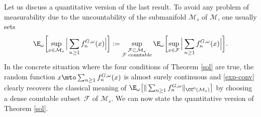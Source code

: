Let us discuss a quantitative version of the last result.
To avoid any problem of measurability due to the uncountability of the submanifold $\mathcal{M}_s$ of $\mathcal{M}$, one usually sets%
\begin{equation}\label{exp-conv}
\E_{\omega}\biggl[\sup_{x\in\mathcal{M}_s}\Big|\sum_{n\geq 1} f_n^{G,\omega}(x)\Big|\biggr]:=\sup_{\substack{\mathcal{F}\subset \mathcal{M}_s\\ \mathcal{F} \text{ countable}}} \E_{\omega}\biggl[\sup_{x\in \mathcal{F}}\Big|\sum_{n\geq 1}f_n^{G,\omega}(x)\Big|\biggr].
\end{equation}
In the concrete situation where the four conditions of Theorem \ref{sol} are true, the random function $x\mto \sum_{n\geq 1}f_n^{G,\omega}(x)$ is almost surely continuous and \eqref{exp-conv} clearly recovers
the classical meaning of $\E_{\omega}\bigl[\Vert \sum_{n\geq 1}f_n^{G,\omega}\Vert_{\CC^0(\mathcal{M}_s)} \bigr]$ by choosing a dense countable subset~$\mathcal{F}$ of $\mathcal{M}_s$. We can now state the quantitative version of Theorem \ref{sol}.

